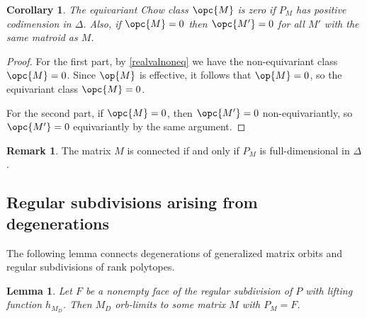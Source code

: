 \documentclass[12pt]{amsart}
\theoremstyle{plain}
\newtheorem{Cor}[Thm]{Corollary}
\newtheorem{Lem}[Thm]{Lemma}
\theoremstyle{definition}
\newtheorem{Rem}[Thm]{Remark}
\theoremstyle{remark}
\begin{document}
\begin{Cor}\label{positivecodim}
The equivariant Chow class $\opc{M}$ is zero if $P_M$ has positive codimension in $\Delta$. Also, if $\opc{M}=0$ then $\opc{M'}=0$ for all $M'$ with the same matroid as $M$.  
\end{Cor}
\begin{proof}
For the first part, by \cref{realvalnoneq} we have the non-equivariant class $\opc{M}=0$. Since $\op{M}$ is effective, it follows that $\op{M} = 0$, so the equivariant class $\opc{M} = 0$.

For the second part, if $\opc{M}=0$, then $\opc{M'}=0$ non-equivariantly, so $\opc{M'}=0$ equivariantly by the same argument. 
\end{proof}
\begin{Rem}
The matrix $M$ is connected if and only if $P_M$ is full-dimensional in $\Delta$.
\end{Rem}

\subsection{Regular subdivisions arising from degenerations}\label{dsection}
The following lemma connects degenerations of generalized matrix orbits and regular subdivisions of rank polytopes.

\begin{Lem}
\label{lpath}
Let $F$ be a nonempty face of the regular subdivision of $P$ with lifting function $h_{M_D}$. Then $M_D$ orb-limits to some matrix $M$ with $P_M=F$.
\end{Lem}
\end{document}

